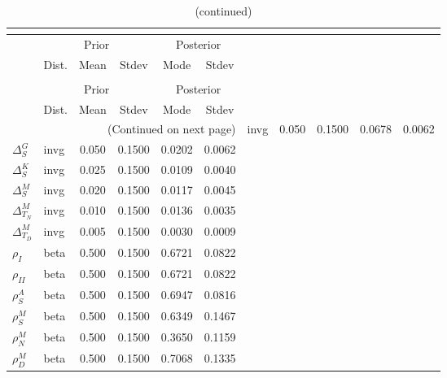  
\begin{center}
\begin{longtable}{llcccc} 
\caption{Results from posterior maximization (parameters)}\\
 \label{Table:Posterior:1}\\
\toprule 
  & \multicolumn{3}{c}{Prior}  &  \multicolumn{2}{c}{Posterior} \\
  \cmidrule(r{.75em}){2-4} \cmidrule(r{.75em}){5-6}
  & Dist. & Mean  & Stdev & Mode & Stdev \\ 
\midrule \endfirsthead 
\caption{(continued)}\\
 \bottomrule 
  & \multicolumn{3}{c}{Prior}  &  \multicolumn{2}{c}{Posterior} \\
  \cmidrule(r{.75em}){2-4} \cmidrule(r{.75em}){5-6}
  & Dist. & Mean  & Stdev & Mode & Stdev \\ 
\midrule \endhead 
\bottomrule \multicolumn{6}{r}{(Continued on next page)}\endfoot 
\bottomrule\endlastfoot 
${\Delta^{A}_{S}}$ & invg &   0.050 & 0.1500 &   0.0678 &  0.0062 \\ 
${\Delta^{G}_{S}}$ & invg &   0.050 & 0.1500 &   0.0202 &  0.0062 \\ 
${\Delta^{K}_{S}}$ & invg &   0.025 & 0.1500 &   0.0109 &  0.0040 \\ 
${\Delta^{M}_{S}}$ & invg &   0.020 & 0.1500 &   0.0117 &  0.0045 \\ 
${\Delta^{M}_{T_N}}$ & invg &   0.010 & 0.1500 &   0.0136 &  0.0035 \\ 
${\Delta^{M}_{T_D}}$ & invg &   0.005 & 0.1500 &   0.0030 &  0.0009 \\ 
${\rho_{I}}$ & beta &   0.500 & 0.1500 &   0.6721 &  0.0822 \\ 
${\rho_{II}}$ & beta &   0.500 & 0.1500 &   0.6721 &  0.0822 \\ 
${\rho^{A}_{S}}$ & beta &   0.500 & 0.1500 &   0.6947 &  0.0816 \\ 
${\rho^{M}_{S}}$ & beta &   0.500 & 0.1500 &   0.6349 &  0.1467 \\ 
${\rho^{M}_{N}}$ & beta &   0.500 & 0.1500 &   0.3650 &  0.1159 \\ 
${\rho^{M}_{D}}$ & beta &   0.500 & 0.1500 &   0.7068 &  0.1335 \\ 
\end{longtable}
 \end{center}
